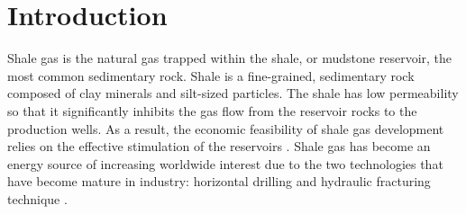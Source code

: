 \section{Introduction}





Shale gas is the natural gas trapped within the shale, or mudstone reservoir, the most common sedimentary rock.  %
Shale is a fine-grained, sedimentary rock composed of clay minerals and silt-sized particles. %
The shale has low permeability so that it significantly inhibits the gas flow from the reservoir rocks to the production wells. As a result, the economic feasibility of shale gas development relies on the effective stimulation of the reservoirs \cite{hattori2017numerical}.
Shale gas has become an energy source of increasing worldwide interest due to the two technologies that have become mature in industry: horizontal drilling and hydraulic fracturing technique \cite{middleton2014co2}.


